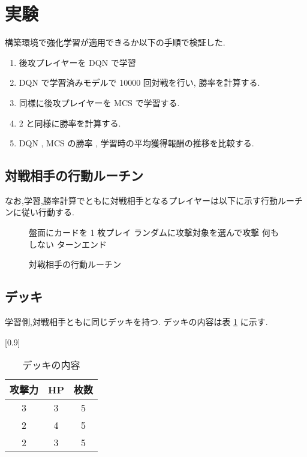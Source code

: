 \documentclass[twocolumn]{jarticle}     %
\begin{document}
\section{実験}
構築環境で強化学習が適用できるか以下の手順で検証した.
\begin{enumerate}
  \setlength{\itemsep}{0cm} %
  \item 後攻プレイヤーを DQN で学習
  \item DQN で学習済みモデルで 10000 回対戦を行い, 勝率を計算する.
  \item 同様に後攻プレイヤーを MCS で学習する.
  \item 2 と同様に勝率を計算する.
  \item DQN , MCS の勝率 , 学習時の平均獲得報酬の推移を比較する.
\end{enumerate}

\subsection{対戦相手の行動ルーチン}

なお,学習,勝率計算でともに対戦相手となるプレイヤーは以下に示す行動ルーチンに従い行動する.
\begin{figure}[H]
  \begin{algorithm}[H]
      \caption{
        \small
        対戦相手の行動ルーチン
        }
      \label{alg1}
      \begin{algorithmic}[1] 
        \small
      \STATE 盤面にカードを 1 枚プレイ
      \STATE ランダムに攻撃対象を選んで攻撃
      \ELSE
      \STATE 何もしない
      \ENDIF
      \ENDFOR
      \STATE ターンエンド
      \end{algorithmic}
  \end{algorithm}
  \end{figure}


\subsection{デッキ}
学習側,対戦相手ともに同じデッキを持つ.
デッキの内容は表 \ref{table:deck} に示す.
\begin{table}[H]
  \centering
  \caption{デッキの内容}
  \label{table:deck}
  \scalebox{0.9}[0.9]{
    \begin{tabular}{|c|c|c|}
      \hline
      攻撃力 &  HP  & 枚数 \\ \hline \hline
      3 & 3 & 5  \\ \hline
      2 & 4 & 5  \\ \hline
      2 & 3 & 5  \\ \hline
      \end{tabular}
  }
  \end{table}
\end{document}
